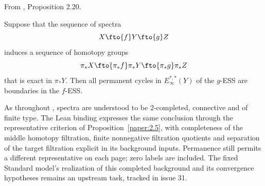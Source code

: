 \begin{proposition}
\label{paper:2.20}
From \cite{LWX126}, Proposition 2.20.\par
\label{prop:cfe810af}
    Suppose that the sequence of spectra
    $$X\fto{f}Y\fto{g}Z$$
    induces a sequence of homotopy groups
    $$\pi_*X\fto{\pi_*f}\pi_*Y\fto{\pi_*g}\pi_*Z$$
    that is exact in $\pi_*Y$. Then all permanent cycles in $E^{*,*}_\infty(Y)$ of the $g$-ESS are boundaries in the $f$-ESS.

As throughout \cite{LWX126}, spectra are understood to be 2-completed,
connective and of finite type. The Lean binding expresses the same
conclusion through the representative criterion of
Proposition~\ref{paper:2.5}, with completeness of the middle homotopy
filtration, finite nonnegative filtration quotients and separation of the
target filtration explicit in its background inputs. Permanence still
permits a different representative on each page; zero labels are included.
The fixed Standard model's realization of this completed background and
its convergence hypotheses remains an upstream task, tracked in
issue 31.
\end{proposition}
